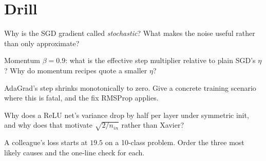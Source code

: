 \section*{Drill}
\begin{exercise}[{[easy]}]
Why is the SGD gradient called \emph{stochastic}? What makes the noise
useful rather than only approximate?
\end{exercise}
\begin{exercise}[{[easy]}]
Momentum $\beta=0.9$: what is the effective step multiplier relative
to plain SGD's $\eta$? Why do momentum recipes quote a smaller $\eta$?
\end{exercise}
\begin{exercise}[{[medium]}]
AdaGrad's step shrinks monotonically to zero. Give a concrete training
scenario where this is fatal, and the fix RMSProp applies.
\end{exercise}
\begin{exercise}[{[medium]}]
Why does a ReLU net's variance drop by half per layer under symmetric
init, and why does that motivate $\sqrt{2/n_{in}}$ rather than Xavier?
\end{exercise}
\begin{exercise}[{[hard]}]
A colleague's loss starts at $19.5$ on a 10-class problem. Order the
three most likely causes and the one-line check for each.
\end{exercise}

